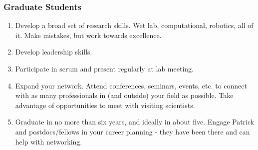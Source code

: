 \documentclass[10pt, letterpaper, twocolumn]{article} %
\begin{document}
\subsubsection{Graduate Students}
\begin{enumerate}
\item Develop a broad set of research skills. Wet lab, computational, robotics, all of it. Make mistakes, but work towards excellence.
\item Develop leadership skills.
\item Participate in scrum and present regularly at lab meeting.
\item Expand your network. Attend conferences, seminars, events, etc. to connect with as many professionals in (and outside) your field as possible. Take advantage of opportunities to meet with visiting scientists.
\item Graduate in no more than six years, and ideally in about five. Engage Patrick and postdocs/fellows in your career planning - they have been there and can help with networking.
\end{enumerate}
\end{document}
